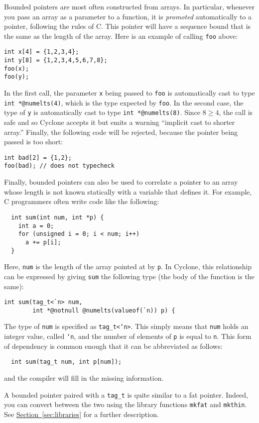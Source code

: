 Bounded pointers are most often constructed from arrays.  In
particular, whenever you pass an array as a parameter to a function,
it is \emph{promoted} automatically to a pointer, following the rules
of C.  This pointer will have a sequence bound that is the same as the
length of the array.  Here is an example of calling \texttt{foo} above:
\begin{verbatim}
int x[4] = {1,2,3,4};
int y[8] = {1,2,3,4,5,6,7,8};
foo(x);
foo(y);
\end{verbatim}
In the first call, the parameter \texttt{x} being passed to
\texttt{foo} is automatically cast to type \texttt{int *@numelts(4)},
which is the type expected by \texttt{foo}.  In the second case, the
type of \texttt{y} is automatically cast to type \texttt{int
*@numelts(8)}.  Since $8 \geq 4$, the call is safe and so Cyclone
accepts it but emits a warning ``implicit cast to shorter array.''
Finally, the following code will be rejected, because the pointer
being passed is too short:
\begin{verbatim}
int bad[2] = {1,2};
foo(bad); // does not typecheck
\end{verbatim}

Finally, bounded pointers can also be used to correlate a pointer to
an array whose length is not known statically with a variable that
defines it.  For example, C programmers often write code like the
following:
\begin{verbatim}
  int sum(int num, int *p) {
    int a = 0;
    for (unsigned i = 0; i < num; i++) 
      a += p[i];
  }
\end{verbatim}
Here, \texttt{num} is the length of the array pointed at by
\texttt{p}.  In Cyclone, this relationship can be expressed by giving
\texttt{sum} the following type (the body of the function is the
same):
\begin{verbatim}
int sum(tag_t<`n> num, 
        int *@notnull @numelts(valueof(`n)) p) {
\end{verbatim}
The type of \texttt{num} is specified as \texttt{tag_t<`n>}.  This
simply means that \texttt{num} holds an integer value, called \texttt{`n},
and the number of elements of \texttt{p} is equal to \texttt{n}.  
This form of dependency is common enough that it can be abbreviated
as follows:
\begin{verbatim}
  int sum(tag_t num, int p[num]);
\end{verbatim}
and the compiler will fill in the missing information.

A bounded pointer paired with a \texttt{tag_t} is quite similar
to a fat pointer.  Indeed, you can convert between the two using the
library functions \texttt{mkfat} and \texttt{mkthin}.  See
\hyperref[{sec:libraries}]{Section~\ref{sec:libraries}} for a further
description.

